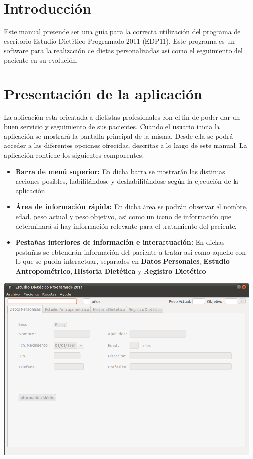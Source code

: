 \documentclass[12pt, spanish]{article}
\begin{document}
\tableofcontents
\newpage
\section{Introducción}
Este manual pretende ser una guía para la correcta utilización del programa
de escritorio Estudio Dietético Programado 2011 (EDP11).
Este programa es un software para la realización de dietas personalizadas así
como el seguimiento del paciente en su evolución.
\newpage


\section{Presentación de la aplicación}
La aplicación esta orientada a dietistas profesionales con el fin de poder dar un buen servicio y seguimiento de sus pacientes.
Cuando el usuario inicia la aplicación se mostrará la pantalla principal de la misma. Desde ella se podrá acceder a las diferentes opciones ofrecidas, descritas a lo largo de este manual.
La aplicación contiene los siguientes componentes:
\begin{itemize}
\item \textbf{Barra de menú superior:} En dicha barra se mostrarán las distintas acciones posibles, habilitándose y deshabilitándose según la ejecución de la aplicación.
\item \textbf{Área de información rápida:} En dicha área se podrán observar el nombre, edad, peso actual y peso objetivo, así como un icono de información que determinará si hay información relevante para el tratamiento del paciente.
\item \textbf{Pestañas interiores de información e interactuación:} En dichas pestañas se obtendrán información del paciente a tratar así como aquello con lo que se pueda interactuar, separados en \textbf{Datos Personales}, \textbf{Estudio Antropométrico}, \textbf{Historia Dietética} y \textbf{Registro Dietético}
\end{itemize}
\includegraphics[scale=0.5]{Image/aplicacion.png} 
\newpage
\end{document}
